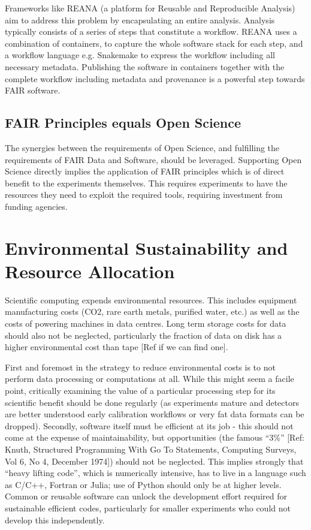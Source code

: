 Frameworks like REANA (a platform for Reusable and Reproducible Analysis) aim to address this problem by encapsulating an entire analysis.  Analysis typically consists of a series of steps that constitute a workflow.  REANA uses a combination of containers, to capture the whole software stack for each step, and a workflow language e.g. Snakemake to express the workflow including all necessary metadata. Publishing the software in containers together with the complete workflow including metadata and provenance is a powerful step towards FAIR software.


\subsection{FAIR Principles equals Open Science}

The synergies between the requirements of Open Science, and fulfilling the requirements of FAIR Data and Software, should be leveraged.  Supporting Open Science directly implies the application of FAIR principles which is of direct benefit to the experiments themselves. This requires experiments to have the resources they need to exploit the required tools, requiring investment from funding agencies.


\section{Environmental Sustainability and Resource Allocation}

Scientific computing expends environmental resources. This includes equipment manufacturing costs (CO2, rare earth metals, purified water, etc.) as well as the costs of powering machines in data centres. Long term storage costs for data should also not be neglected, particularly the fraction of data on disk has a higher environmental cost than tape [Ref if we can find one]. 

First and foremost in the strategy to reduce environmental costs is to not perform data processing or computations at all. While this might seem a facile point, critically examining the value of a particular processing step for its scientific benefit should be done regularly (as experiments mature and detectors are better understood early calibration workflows or very fat data formats can be dropped). Secondly, software itself must be efficient at its job - this should not come at the expense of maintainability, but opportunities (the famous “3\%” [Ref: Knuth, Structured Programming With Go To Statements, Computing Surveys, Vol 6, No 4, December 1974]) should not be neglected. This implies strongly that “heavy lifting code”, which is numerically intensive, has to live in a language such as C/C++, Fortran or Julia; use of Python should only be at higher levels. Common or reusable software can unlock the development effort required for sustainable efficient codes, particularly for smaller experiments who could not develop this independently.

